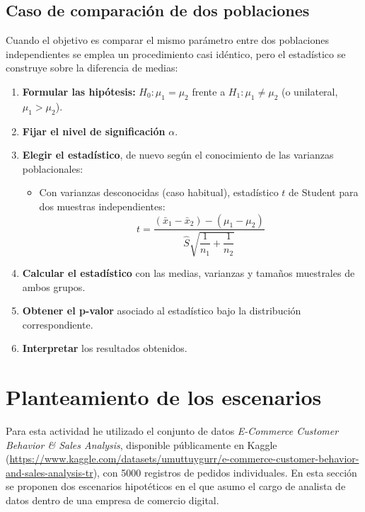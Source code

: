 \documentclass[11pt, a4paper]{article}
\begin{document}
\subsection{Caso de comparación de dos poblaciones}

Cuando el objetivo es comparar el mismo parámetro entre dos poblaciones independientes se emplea 
un procedimiento casi idéntico, pero el estadístico se construye sobre la diferencia de 
medias:

\begin{enumerate}
  \item \textbf{Formular las hipótesis:} $H_0: \mu_1 = \mu_2$ frente a $H_1: \mu_1 \neq \mu_2$ (o unilateral, $\mu_1 > \mu_2$).

  \item \textbf{Fijar el nivel de significación} $\alpha$.

  \item \textbf{Elegir el estadístico}, de nuevo según el conocimiento de las varianzas 
  poblacionales:
  \begin{itemize}
    \item Con varianzas desconocidas (caso habitual), estadístico $t$ de Student para dos muestras independientes:
    \[
    t = \frac{(\bar{x}_1 - \bar{x}_2) - (\mu_1 - \mu_2)}{\hat{S}\sqrt{\dfrac{1}{n_1} + \dfrac{1}{n_2}}}
    \]
  \end{itemize}

  \item \textbf{Calcular el estadístico} con las medias, varianzas y tamaños muestrales de ambos grupos.

  \item \textbf{Obtener el p-valor} asociado al estadístico bajo la distribución correspondiente.

  \item \textbf{Interpretar} los resultados obtenidos.
\end{enumerate}


\section{Planteamiento de los escenarios}

Para esta actividad he utilizado el conjunto de datos 
\textit{E-Commerce Customer Behavior \& Sales Analysis}, disponible públicamente en Kaggle 
(\url{https://www.kaggle.com/datasets/umuttuygurr/e-commerce-customer-behavior-and-sales-analysis-tr}), 
con 5000 registros de pedidos individuales. En esta sección se proponen dos escenarios 
hipotéticos en el que asumo el cargo de analista de datos dentro de una empresa de comercio
digital.
\end{document}

